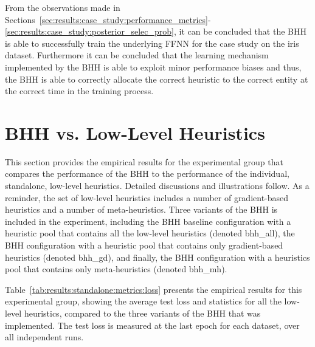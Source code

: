 From the observations made in Sections~\ref{sec:results:case_study:performance_metrics}-\ref{sec:results:case_study:posterior_selec_prob}, it can be concluded that the \acs{BHH} is able to successfully train the underlying \acs{FFNN} for the case study on the iris dataset. Furthermore it can be concluded that the learning mechanism implemented by the \acs{BHH} is able to exploit minor performance biases and thus, the \acs{BHH} is able to correctly allocate the correct heuristic to the correct entity at the correct time in the training process.

\section{BHH vs. Low-Level Heuristics}\label{sec:results:standalone}

This section provides the empirical results for the experimental group that compares the performance of the \acs{BHH} to the performance of the individual, standalone, low-level heuristics. Detailed discussions and illustrations follow. As a reminder, the set of low-level heuristics includes a number of gradient-based heuristics and a number of meta-heuristics. Three variants of the \acs{BHH} is included in the experiment, including the \acs{BHH} baseline configuration with a heuristic pool that contains all the low-level heuristics (denoted bhh\_all), the \acs{BHH} configuration with a heuristic pool that contains only gradient-based heuristics (denoted bhh\_gd), and finally, the \acs{BHH} configuration with a heuristics pool that contains only meta-heuristics (denoted bhh\_mh).

Table~\ref{tab:results:standalone:metrics:loss} presents the empirical results for this experimental group, showing the average test loss and statistics for all the low-level heuristics, compared to the three variants of the \acs{BHH} that was implemented. The test loss is measured at the last epoch for each dataset, over all independent runs.

